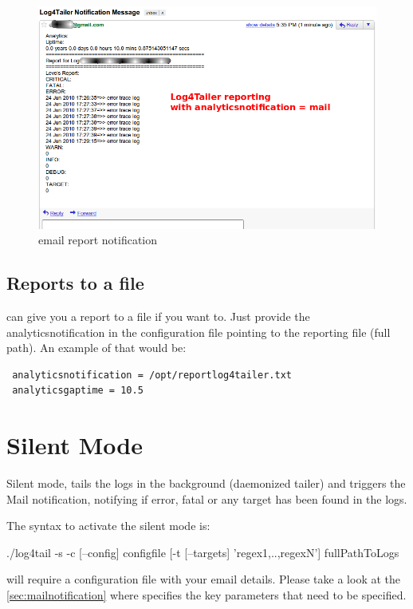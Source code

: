 \begin{figure}[ht]
\includegraphics[scale=0.50]{emailnotification.png}
\caption{\logftailer{} email report notification}\label{fig:emailnotification}
\end{figure}

\subsection{Reports to a file}
\logftailer{} can give you a report to a file if you want to. Just provide the
analyticsnotification in the configuration file pointing to the reporting file
(full path). An example of that would be:

\begin{config}
\begin{verbatim}
 analyticsnotification = /opt/reportlog4tailer.txt
 analyticsgaptime = 10.5
\end{verbatim}
\end{config}

\section{Silent Mode}
Silent mode, tails the logs in the background (daemonized tailer) and triggers
the Mail notification, notifying if error, fatal or any target has been found
in the logs. 

The syntax to activate the silent mode is:
\begin{cmd}
 ./log4tail -s -c [--config] configfile [-t [--targets] 'regex1,..,regexN'] fullPathToLogs
\end{cmd}

\logftailer{} will require a configuration file with your email details. Please
take a look at the \autoref{sec:mailnotification} where specifies the key
parameters that need to be specified. 

